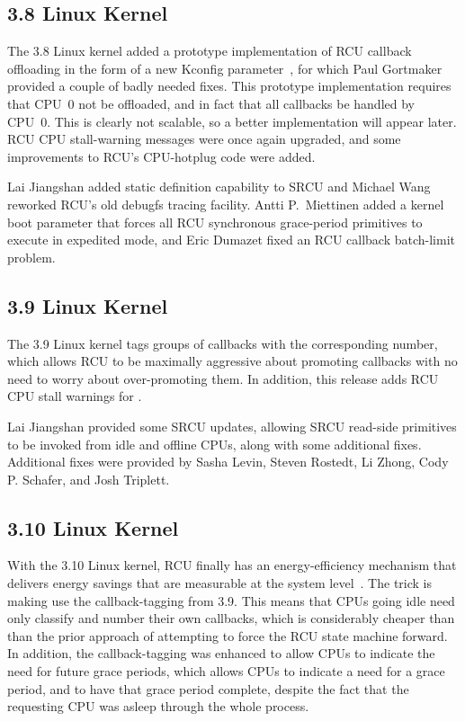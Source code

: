 \subsection{3.8 Linux Kernel}

The 3.8 Linux kernel added a prototype implementation of RCU callback
offloading in the form of a new  Kconfig
parameter~\cite{JonCorbet2012NOCB}, for which Paul Gortmaker provided
a couple of badly needed fixes.
This prototype implementation requires that CPU~0 not be offloaded,
and in fact that all callbacks be handled by CPU~0.
This is clearly not scalable, so a better implementation will appear later.
RCU CPU stall-warning messages were once again upgraded, and some
improvements to RCU's CPU-hotplug code were added.

Lai Jiangshan added static definition capability to SRCU and Michael
Wang reworked RCU's old debugfs tracing facility.
Antti P.~Miettinen added a kernel boot parameter that forces all RCU
synchronous grace-period primitives to execute in expedited mode,
and Eric Dumazet fixed an RCU callback batch-limit problem.

\subsection{3.9 Linux Kernel}

The 3.9 Linux kernel tags groups of callbacks with the corresponding
number, which allows RCU to be maximally aggressive about promoting
callbacks with no need to worry about over-promoting them.
In addition, this release adds RCU CPU stall warnings for .

Lai Jiangshan provided some SRCU updates, allowing SRCU read-side primitives
to be invoked from idle and offline CPUs, along with some additional
fixes.
Additional fixes were provided by Sasha Levin, Steven Rostedt,
Li Zhong, Cody P. Schafer, and Josh Triplett.

\subsection{3.10 Linux Kernel}

With the 3.10 Linux kernel, RCU finally has an energy-efficiency mechanism
that delivers energy savings that are measurable at the system
level~\cite{PaulMcKenney2013AMPenergyHOTPAR}.
The trick is making  use the callback-tagging from
3.9.
This means that CPUs going idle need only classify and number their own
callbacks, which is considerably cheaper than than the prior approach
of attempting to force the RCU state machine forward.
In addition, the callback-tagging was enhanced to allow CPUs to indicate
the need for future grace periods, which allows CPUs to indicate a need
for a grace period, and to have that grace period complete, despite the
fact that the requesting CPU was asleep through the whole process.

